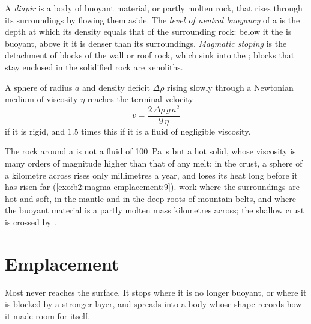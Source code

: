 \begin{definition}\label{def:b2:magma-emplacement:ascent}
A \emph{diapir} is a body of buoyant material,  or partly molten
rock, that rises through its surroundings by flowing them aside. The
\emph{level of neutral buoyancy} of a  is the
depth at which its density equals that of the surrounding rock: below it the
 is buoyant, above it it is denser than its surroundings. \emph{Magmatic
stoping} is the detachment of blocks of the wall or roof
rock, which sink into the ; blocks that stay enclosed in the solidified
rock are xenoliths.
\end{definition}

\begin{proposition}\label{prop:b2:magma-emplacement:stokes}
A sphere of radius $a$ and density deficit $\Delta\rho$ rising slowly through a
Newtonian medium of viscosity $\eta$ reaches the terminal velocity
\[
v = \frac{2\,\Delta\rho\,g\,a^2}{9\,\eta}
\]
if it is rigid, and $1.5$ times this if it is a fluid of negligible viscosity.
\end{proposition}
\admitted

The rock around a  is not a fluid of \qty{100}{Pa.s} but a hot solid,
whose viscosity is many orders of magnitude higher than that of any melt: in the
crust, a sphere of  a kilometre across rises only millimetres a year, and
loses its heat long before it has risen far (\cref{exo:b2:magma-emplacement:9}). 
work where the surroundings are hot and soft, in the mantle and in the deep
roots of mountain belts, and where the buoyant material is a partly molten mass
kilometres across; the shallow crust is crossed by .

\section{Emplacement}

Most  never reaches the surface. It stops where it is no longer buoyant,
or where it is blocked by a stronger layer, and spreads into a body whose shape
records how it made room for itself.

